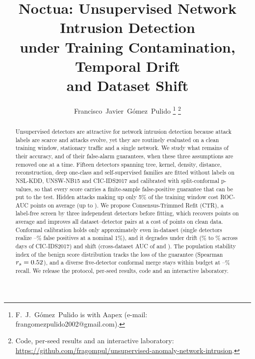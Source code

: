\documentclass[journal]{IEEEtran}
\begin{document}
\title{Noctua: Unsupervised Network Intrusion Detection\\under Training Contamination, Temporal Drift\\and Dataset Shift}

\author{Francisco~Javier~G\'omez~Pulido%
\thanks{F.~J.~G\'omez~Pulido is with Aapex (e-mail: frangomezpulido2002@gmail.com).}%
\thanks{Code, per-seed results and an interactive laboratory: \url{https://github.com/fragompul/unsupervised-anomaly-network-intrusion}.}}

\maketitle

\begin{abstract}
Unsupervised detectors are attractive for network intrusion detection because attack labels are scarce and attacks evolve, yet they are routinely evaluated on a clean training window, stationary traffic and a single network. We study what remains of their accuracy, and of their false-alarm guarantees, when these three assumptions are removed one at a time. Fifteen detectors spanning tree, kernel, density, distance, reconstruction, deep one-class and self-supervised families are fitted without labels on NSL-KDD, UNSW-NB15 and CIC-IDS2017 and calibrated with split-conformal p-values, so that every score carries a finite-sample false-positive guarantee that can be put to the test. Hidden attacks making up only 5\% of the training window cost \meanDropFivePts{} ROC-AUC points on average (up to \worstDropPts{}). We propose Consensus-Trimmed Refit (CTR), a label-free screen by three independent detectors before fitting, which recovers \ctrGainFivePts{} points on average and improves all \ctrPairs{} dataset--detector pairs at a cost of \ctrCostZero{} points on clean data. Conformal calibration holds only approximately even in-dataset (single detectors realize \singleFprUNSW--\singleFprCIC\% false positives at a nominal 1\%), and it degrades under drift (\driftBestFpr\% to \driftWorstFpr\% across days of CIC-IDS2017) and shift (cross-dataset AUC of \transferUC{} and \transferCU{}). The population stability index of the benign score distribution tracks the loss of the guarantee (Spearman $r_s=0.52$), and a diverse five-detector conformal merge stays within budget at \divTprMin--\divTprMax\% recall. We release the protocol, per-seed results, code and an interactive laboratory.
\end{abstract}
\end{document}
